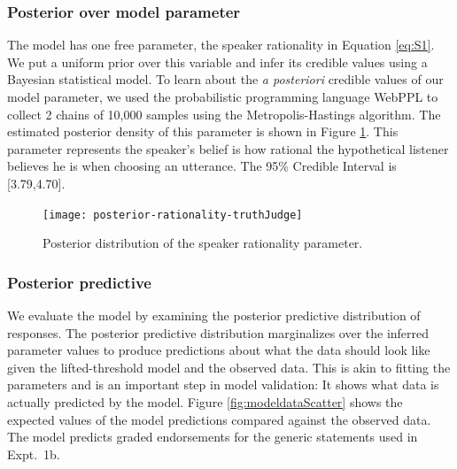 \documentclass[10pt,letterpaper]{article}
\begin{document}
\subsubsection{Posterior over model parameter}

The model has one free parameter, the speaker rationality in Equation \ref{eq:S1}. 
We put a uniform prior over this variable and infer its credible values using a Bayesian statistical model. 
To learn about the \emph{a posteriori} credible values of our model parameter, we used the probabilistic programming language WebPPL \cite{dippl} to collect 2 chains of 10,000 samples using the Metropolis-Hastings algorithm. 
The estimated posterior density of this parameter is shown in Figure \ref{fig:rationality}. 
This parameter represents the speaker's belief is how rational the hypothetical listener believes he is when choosing an utterance. 
The 95\% Credible Interval is [3.79,4.70].

\begin{figure}
\centering
    \texttt{[image: posterior-rationality-truthJudge]}
    \caption{Posterior distribution of the speaker rationality parameter.}
  \label{fig:rationality}
\end{figure}


\subsubsection{Posterior predictive}

We evaluate the model by examining the posterior predictive distribution of responses. The posterior predictive distribution marginalizes over the inferred parameter values to produce predictions about what the data should look like given the lifted-threshold model and the observed data. This is akin to fitting the parameters and is an important step in model validation: It shows what data is actually predicted by the model. 
Figure \ref{fig:modeldataScatter} shows the expected values of the model predictions compared against the observed data. 
The model predicts graded endorsements for the generic statements used in Expt.~1b. 
\end{document}
